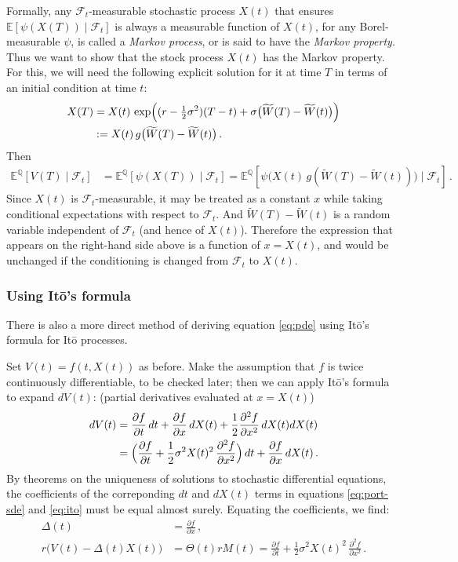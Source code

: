 \documentclass[12pt]{article}
\providecommand{\pd}[2]{\frac{\partial #1}{\partial #2}}
\providecommand{\pdd}[2]{\frac{\partial^2 #1}{\partial #2}}
\newcommand{\sF}{\mathcal{F}}
\newcommand{\E}{\mathbb{E}}
\newcommand{\EQ}{\mathbb{E}^\mathbb{Q}}
\begin{document}
Formally, any $\sF_t$-measurable stochastic process
$X(t)$ that 
ensures $\E[ \psi(X(T)) \mid \sF_t]$
is always a measurable function of $X(t)$,
for any Borel-measurable $\psi$,
is called a \emph{Markov process},
or is said to have the \emph{Markov property}.
Thus we want to show that the stock process $X(t)$ has
the Markov property.
For this,  
we will need the following explicit
solution for it at time $T$
in terms of an initial condition at time $t$:
\begin{align*}
X(T) &= X(t) \, \exp\Bigl( (r-\tfrac12 \sigma^2) (T-t) +
\sigma\bigl( \widetilde{W}(T) - \widetilde{W}(t) \bigr) \Bigr) \\
&:= 
 X(t) \, g \bigl( \widetilde{W}(T) - \widetilde{W}(t) \bigr)\,.
\end{align*}
Then
\begin{align*}
\EQ[V(T) \mid \sF_t] &= \EQ[\psi(X(T)) \mid \sF_t] = \EQ\left[ \psi\bigl( X(t) \, g( \widetilde{W}(T) - \widetilde{W}(t) ) \bigr) \mid \sF_t\right]\,.
\end{align*}
Since $X(t)$ is $\sF_t$-measurable,
it may be treated as a constant $x$ while taking conditional
expectations with respect to $\sF_t$.
And $\widetilde{W}(T) - \widetilde{W}(t)$
is a random variable independent of $\sF_t$ (and hence of $X(t)$).
Therefore the expression that appears on the right-hand side
above is a function of $x = X(t)$,
and would be unchanged if the conditioning
is changed from $\sF_t$ to $X(t)$.

\subsubsection{Using It\=o's formula}

There is also a more direct method
of deriving equation \eqref{eq:pde}
using It\=o's formula for It\=o processes.

Set $V(t) = f(t, X(t))$
as before.
Make the assumption that $f$ is twice continuously differentiable,
to be checked later; then we can apply It\=o's formula to expand $dV(t)$:
(partial derivatives evaluated at $x = X(t)$)
\begin{equation}\label{eq:ito}
\begin{split}
dV(t) &= \pd{f}{t} \, dt + \pd{f}{x} \, dX(t) + \frac12 \pdd{f}{x^2}
\,
dX(t) dX(t) \\
&=
\Bigl( \pd{f}{t} + \frac12 \sigma^2 X(t)^2 \, \pdd{f}{x^2} \Bigr) \, dt
+ \pd{f}{x} \, dX(t)\,.
\end{split}
\end{equation}
By theorems on the uniqueness of solutions to stochastic differential
equations, the coefficients of the 
correponding $dt$ and $dX(t)$
terms in equations \eqref{eq:port-sde} and \eqref{eq:ito}
must be equal almost surely.
Equating the coefficients, we find:
\begin{align}
\Delta(t) &= \pd{f}{x}\,, \label{eq:delta} \\
r \bigl( V(t) - \Delta(t) X(t) \bigr) &= \Theta(t) r M(t) = 
\pd{f}{t} + \frac12 \sigma^2 X(t)^2 \, \pdd{f}{x^2} \label{eq:theta}\,.
\end{align}
\end{document}
